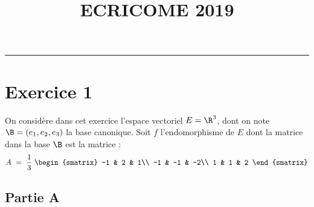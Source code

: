 \documentclass[11pt]{article}%
\title{\bf \vspace{-1.6cm} ECRICOME 2019} %
\author{} %
\date{} %
\begin{document}
\maketitle %
\vspace{-1.2cm}\hrule %
\thispagestyle{fancy}

\vspace*{-.2cm}


\section*{Exercice 1}

\noindent
On considère dans cet exercice l'espace vectoriel $E=\R^3$, dont on
note $\B=(e_1,e_2,e_3)$ la base canonique. Soit $f$ l'endomorphisme de
$E$ dont la matrice dans la base $\B$ est la matrice :
\[
A \ = \ \dfrac{1}{3} \
\begin{smatrix}
  -1 & 2 & 1\\
  -1 & -1 & -2\\
  1 & 1 & 2
\end{smatrix}
\]

\subsection*{Partie A}
\end{document}

